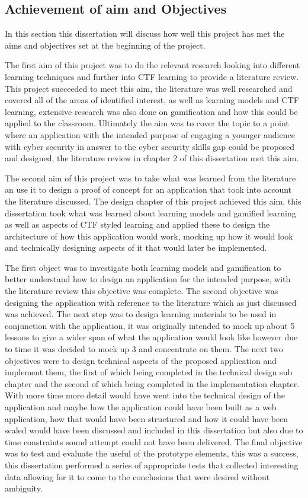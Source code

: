 \documentclass[12pt,a4paper]{article}
\begin{document}
\subsection{Achievement of aim and Objectives}  
In this section this dissertation will discuss how well this project has met the aims and objectives set at the beginning of the project.  

The first aim of this project was to do the relevant research looking into different learning techniques and further into CTF learning to provide a literature review. This project succeeded to meet this aim, the literature was well researched and covered all of the areas of identified interest, as well as learning models and CTF learning, extensive research was also done on gamification and how this could be applied to the classroom. Ultimately the aim was to cover the topic to a point where an application with the intended purpose of engaging a younger audience with cyber security in answer to the cyber security skills gap could be proposed and designed, the literature review in chapter 2 of this dissertation met this aim.   

The second aim of this project was to take what was learned from the literature an use it to design a proof of concept for an application that took into account the literature discussed. The design chapter of this project achieved this aim, this dissertation took what was learned about learning models and gamified learning as well as aspects of CTF styled learning and applied these to design the architecture of how this application would work, mocking up how it would look and technically designing aspects of it that would later be implemented. 

The first object was to investigate both learning models and gamification to better understand how to design an application for the intended purpose, with the literature review this objective was complete. The second objective was designing the application with reference to the literature which as just discussed was achieved. The next step was to design learning materials to be used in conjunction with the application, it was originally intended to mock up about 5 lessons to give a wider span of what the application would look like however due to time it was decided to mock up 3 and concentrate on them. The next two objectives were to design technical aspects of the proposed application and implement them, the first of which being completed in the technical design sub chapter and the second of which being completed in the implementation chapter. With more time more detail would have went into the technical design of the application and maybe how the application could have been built as a web application, how that would have been structured and how it could have been scaled would have been discussed and included in this dissertation but also due to time constraints sound attempt could not have been delivered. The final objective was to test and evaluate the useful of the prototype elements, this was a success, this dissertation performed a series of appropriate tests that collected interesting data allowing for it to come to the conclusions that were desired without ambiguity.  
\end{document}
